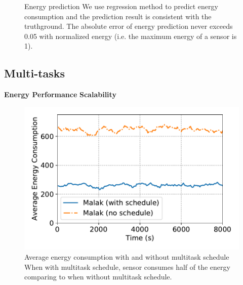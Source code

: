 \begin{figure}[htbp]
	\centering
	\hspace{0.3cm}
	\vspace{-0.1in}
	\caption{Energy prediction
		\textnormal{
			We use regression method to predict energy consumption and the
			prediction result is consistent with the truthground.  The absolute
			error of energy prediction never exceeds 0.05 with normalized energy
			(i.e. the maximum energy of a sensor is 1).
		}
	}
	\label{fig:energy_pred}
\end{figure}

\subsection{Multi-tasks}
\textbf{Energy Performance}
\textbf{Scalability}
\begin{figure}[htbp]
	\centering
	\includegraphics[width=.85\columnwidth]{Figure/multitask_energy}
	\vspace{-0.1in}
	\caption{Average energy consumption with and without multitask schedule
		\textnormal{When with multitask schedule, sensor consumes half of the energy
			comparing to when without multitask schedule.}}
	\label{fig:multitask_energy}
\end{figure}
